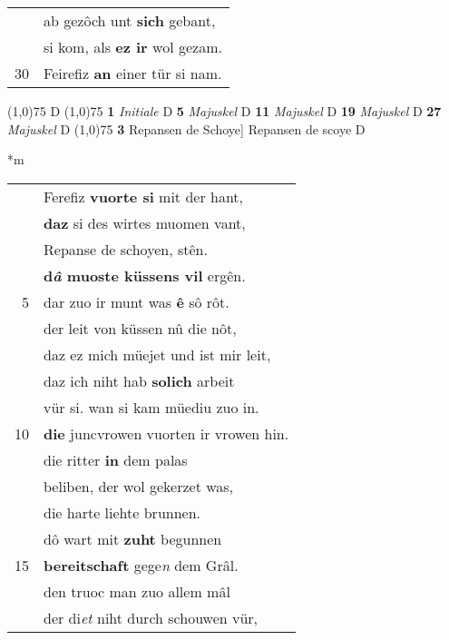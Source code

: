 \documentclass[8pt,a4paper,notitlepage]{article}
\begin{document}
\begin{table}[ht]
\begin{minipage}[t]{0.5\linewidth}
\begin{tabular}{rl}
 & ab gezôch unt \textbf{sich} gebant,\\ 
 & si kom, als \textbf{ez ir} wol gezam.\\ 
30 & Feirefiz \textbf{an} einer tür si nam.\\ 
\end{tabular}
\scriptsize
\line(1,0){75} \newline
D \newline
\line(1,0){75} \newline
\textbf{1} \textit{Initiale} D  \textbf{5} \textit{Majuskel} D  \textbf{11} \textit{Majuskel} D  \textbf{19} \textit{Majuskel} D  \textbf{27} \textit{Majuskel} D  \newline
\line(1,0){75} \newline
\textbf{3} Repansen de Schoye] Repansen de scoye D \newline
\end{minipage}
\hspace{0.5cm}
\begin{minipage}[t]{0.5\linewidth}
\small
\begin{center}*m
\end{center}
\begin{tabular}{rl}
 & Ferefiz \textbf{vuorte si} mit der hant,\\ 
 & \textbf{daz} si des wirtes muomen vant,\\ 
 & Repanse de schoyen, stên.\\ 
 & \textbf{d\textit{â} muoste küssens vil} ergên.\\ 
5 & dar zuo ir munt was \textbf{ê} sô rôt.\\ 
 & der leit von küssen nû die nôt,\\ 
 & daz ez mich müejet und ist mir leit,\\ 
 & daz ich niht hab \textbf{solich} arbeit\\ 
 & vür si. wan si kam müediu zuo in.\\ 
10 & \textbf{die} juncvrowen vuorten ir vrowen hin.\\ 
 & die ritter \textbf{in} dem palas\\ 
 & beliben, der wol gekerzet was,\\ 
 & die harte liehte brunnen.\\ 
 & dô wart mit \textbf{zuht} begunnen\\ 
15 & \textbf{bereitschaft} gege\textit{n} dem Grâl.\\ 
 & den truoc man zuo allem mâl\\ 
 & der di\textit{et} niht durch schouwen vür,\\ 

\end{tabular}
\end{minipage}
\end{table}
\end{document}
